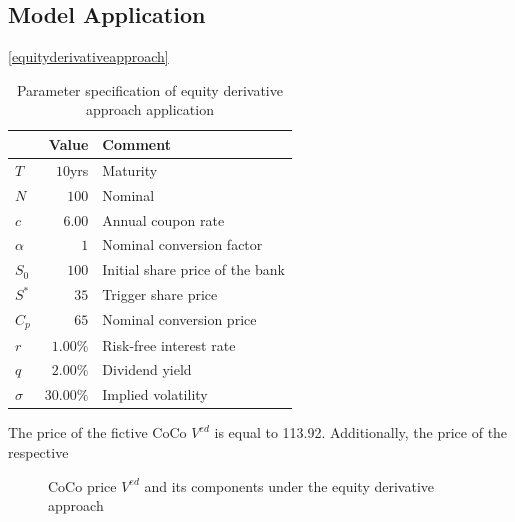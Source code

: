 \subsection{Model Application}

\ref{equityderivativeapproach}

\begin{table}[H]
	\setlength{\extrarowheight}{2.5pt}
	\centering
	\begin{tabular}{lrl}
		\toprule
			 & \textbf{Value} & \textbf{Comment} \\
		\midrule
			$T$ & $10$yrs & Maturity \\
			$N$ & $100$ & Nominal \\			
			$c$ & $6.00$ & Annual coupon rate \\
			$\alpha$ & $1$ & Nominal conversion factor \\ 
			$S_0$ & $100$ & Initial share price of the bank \\
			$S^*$ & $35$ & Trigger share price \\
			$C_p$ & $65$ & Nominal conversion price \\
			$r$ & $1.00 \%$ & Risk-free interest rate\\
			$q$ & $2.00\%$ & Dividend yield \\
			$\sigma$& $30.00 \%$ & Implied volatility \\
		\bottomrule
	\end{tabular}
	\caption[Parameter specification of equity derivative approach application]{Parameter specification of equity derivative approach application \citep{alvemar2012modelling}}
\end{table}

The price of the fictive CoCo $V^{ed}$ is equal to 113.92. Additionally, the price of the respective 

\begin{figure}[H]
\centering
{}
\caption[CoCo price $V^{ed}$ and its components]{CoCo price $V^{ed}$ and its components under the equity derivative approach}
\end{figure}

